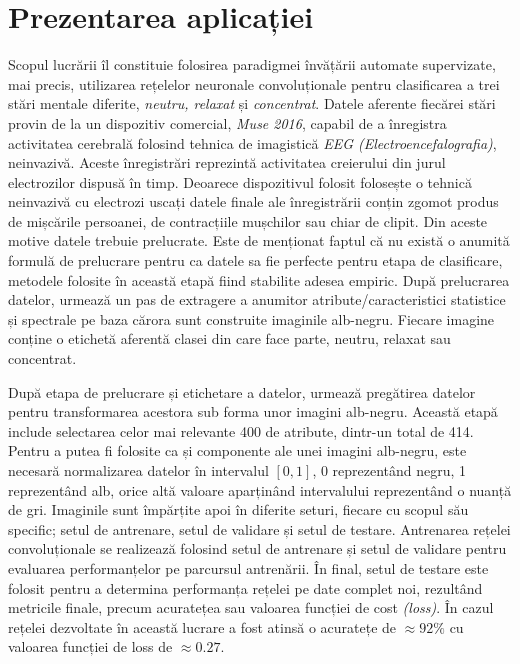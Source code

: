 \chapter{Prezentarea aplicației}\label{ch:3implementare}
Scopul lucrării îl constituie folosirea paradigmei învățării automate supervizate, mai precis, utilizarea rețelelor neuronale convoluționale pentru clasificarea a trei stări mentale diferite, \textit{neutru, relaxat} și \textit{concentrat}. Datele aferente fiecărei stări provin de la un dispozitiv comercial, \textit{Muse 2016}, capabil de a înregistra activitatea cerebrală folosind tehnica de imagistică \textit{EEG (Electroencefalografia)}, neinvazivă. Aceste înregistrări reprezintă activitatea creierului din jurul electrozilor dispusă în timp. Deoarece dispozitivul folosit folosește o tehnică neinvazivă cu electrozi uscați datele finale ale înregistrării conțin zgomot produs de mișcările persoanei, de contracțiile mușchilor sau chiar de clipit. Din aceste motive datele trebuie prelucrate. Este de menționat faptul că nu există o anumită formulă de prelucrare pentru ca datele sa fie perfecte pentru etapa de clasificare, metodele folosite în această etapă fiind stabilite adesea empiric. După prelucrarea datelor, urmează un pas de extragere a anumitor atribute/caracteristici statistice și spectrale pe baza cărora sunt construite imaginile alb-negru. Fiecare imagine conține o etichetă aferentă clasei din care face parte, neutru, relaxat sau concentrat.

După etapa de prelucrare și etichetare a datelor, urmează pregătirea datelor pentru transformarea acestora sub forma unor imagini alb-negru. Această etapă include selectarea celor mai relevante 400 de atribute, dintr-un total de 414. Pentru a putea fi folosite ca și componente ale unei imagini alb-negru, este necesară normalizarea datelor în intervalul $[0,1]$, 0 reprezentând negru, 1 reprezentând alb, orice altă valoare aparținând intervalului reprezentând o nuanță de gri. Imaginile sunt împărțite apoi în diferite seturi, fiecare cu scopul său specific; setul de antrenare, setul de validare și setul de testare. Antrenarea rețelei convoluționale se realizează folosind setul de antrenare și setul de validare pentru evaluarea performanțelor pe parcursul antrenării. În final, setul de testare este folosit pentru a determina performanța rețelei pe date complet noi, rezultând metricile finale, precum acuratețea sau valoarea funcției de cost \textit{(loss)}. În cazul rețelei dezvoltate în această lucrare a fost atinsă o acuratețe de $\approx92\%$ cu valoarea funcției de loss de $\approx0.27$. 

